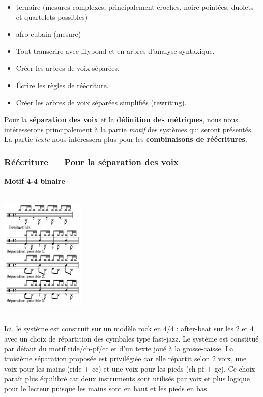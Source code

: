 \begin{itemize}
	\item ternaire (mesures complexes, principalement croches, noire pointées, duolets et quartelets possibles)
	\item afro-cubain (mesure)
	\item Tout transcrire avec lilypond et en arbres d’analyse syntaxique.
	\item Créer les arbres de voix séparées.
	\item Écrire les règles de réécriture.
	\item Créer les arbres de voix séparées simplifiés (rewriting).\\	
\end{itemize}

Pour la \textbf{séparation des voix} et la \textbf{définition des métriques}, nous nous intéresserons principalement à la partie \textit{motif} des systèmes qui seront présentés. La partie \textit{texte} nous intéressera plus pour les \textbf{combinaisons de réécritures}.
\newpage
\subsubsection{Réécriture — Pour la séparation des voix}

\textbf{Motif 4-4 binaire}\\\\
\includegraphics[height=60mm, width=40mm]{z_images/description_notation/separation/1_separation_4-4_binaire.png}\\\\
Ici, le système est construit sur un modèle rock en 4/4 : after-beat sur les 2 et 4 avec un choix de répartition des cymbales type fast-jazz. Le système est constitué par défaut du motif ride/ch-pf/cc et d’un texte joué à la grosse-caisse. La troisième séparation proposée est privilégiée car elle répartit selon 2 voix, une voix pour les mains (ride + cc) et une voix pour les pieds (ch-pf + gc). Ce choix paraît plus équilibré car deux instruments sont utilisés par voix et plus logique pour le lecteur puisque les mains sont en haut et les pieds en bas.\\

